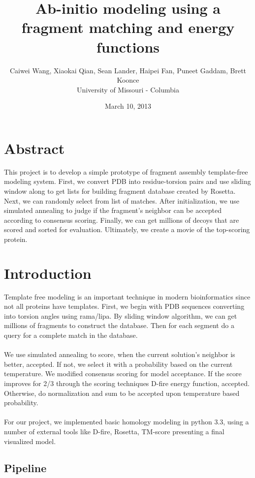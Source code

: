 \documentclass{article}
\title{Ab-initio modeling using a fragment matching and energy functions}
\author{Caiwei Wang, Xiaokai Qian, Sean Lander, Haipei Fan, Puneet Gaddam, Brett Koonce\\University of Missouri - Columbia}
\date{March 10, 2013}
\begin{document}
\maketitle

\section{Abstract}
This project is to develop a simple prototype of fragment assembly template-free modeling system. First, we convert PDB into residue-torsion pairs and use sliding window along to get lists for building fragment database created by Rosetta. Next, we can randomly select from list of matches. After initialization, we use simulated annealing to judge if the fragment’s neighbor can be accepted according to consensus scoring. Finally, we can get millions of decoys that are scored and sorted for evaluation. Ultimately, we create a movie of the top-scoring protein.

\section{Introduction}

Template free modeling is an important technique in modern bioinformatics since not all proteins have templates. First, we begin with PDB sequences converting into torsion angles using rama/lipa. By sliding window algorithm, we can get millions of fragments to construct the database. Then for each segment do a query for a complete match in the database.\\\\
We use simulated annealing to score, when the current solution’s neighbor is better, accepted. If not, we select it with a probability based on the current temperature. We modified consensus scoring for model acceptance. If the score improves for 2/3 through the scoring techniques D-fire energy function, accepted. Otherwise, do normalization and sum to be accepted upon temperature based probability.\\\\
For our project, we implemented basic homology modeling in python 3.3, using a number of external tools like D-fire, Rosetta, TM-score presenting a final visualized model.


\subsection{Pipeline}
\end{document}
